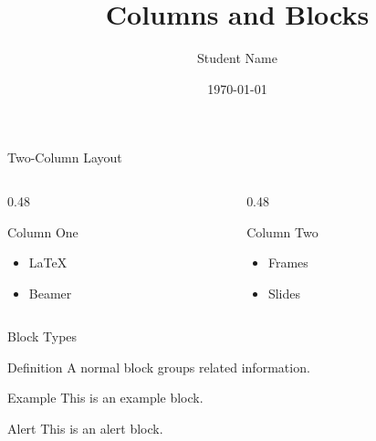 \documentclass{beamer}
\title{Columns and Blocks}
\author{Student Name}
\date{\today}
\begin{document}
\begin{frame}
  \titlepage
\end{frame}
\begin{frame}{Two-Column Layout}
  \begin{columns}
    \begin{column}{0.48\textwidth}
      \begin{block}{Column One}
        \begin{itemize}
          \item LaTeX
          \item Beamer
        \end{itemize}
      \end{block}
    \end{column}
    \begin{column}{0.48\textwidth}
      \begin{block}{Column Two}
        \begin{itemize}
          \item Frames
          \item Slides
        \end{itemize}
      \end{block}
    \end{column}
  \end{columns}
\end{frame}
\begin{frame}{Block Types}
  \begin{block}{Definition}
    A normal block groups related information.
  \end{block}
  \begin{exampleblock}{Example}
    This is an example block.
  \end{exampleblock}
  \begin{alertblock}{Alert}
    This is an alert block.
  \end{alertblock}
\end{frame}
\end{document}

